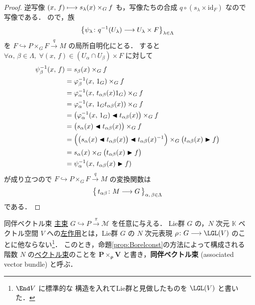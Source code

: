 \documentclass[TQFT_main]{subfiles}
\begin{document}
\begin{proof}
{        逆写像 $(x,\, f) \longmapsto s_\lambda(x) \times_G f$ も，\cinfty 写像たちの合成 $q \circ (s_\lambda \times \mathrm{id}_F)$ なので \cinfty 写像である．
    }
    ので，族 
    \begin{align}
        \bigl\{ \psi_\lambda \colon q^{-1}(U_\lambda) \longrightarrow U_\lambda \times F \bigr\}_{\lambda \in \Lambda}
    \end{align}
    を $F \hookrightarrow P \times_G F \xrightarrow{q} M$ の局所自明化にとる．
    すると $\forall \alpha,\, \beta \in \Lambda,\; \forall (x,\, f) \in (U_\alpha \cap U_\beta) \times F$ に対して
    \begin{align}
        \psi_\beta^{-1} (x,\, f) &= s_\beta(x) \times_G f \\
        &= \varphi_\beta^{-1}(x,\, 1_G) \times_G f \\
        &= \varphi_\alpha^{-1}(x,\, t_{\alpha\beta}(x)1_G) \times_G f \\
        &= \varphi_\alpha^{-1}(x,\, 1_G t_{\alpha\beta}(x)) \times_G f \\
        &= \bigl(\varphi_\alpha^{-1}(x,\, 1_G) \blacktriangleleft t_{\alpha\beta}(x)\bigr) \times_G f \\
        &= \bigl(s_\alpha (x) \blacktriangleleft t_{\alpha\beta}(x)\bigr) \times_G f \\
        &= \Bigl( \bigl(s_\alpha (x) \blacktriangleleft t_{\alpha\beta}(x)\bigr) \blacktriangleleft t_{\alpha\beta}(x)^{-1} \Bigr) \times_G \bigl(t_{\alpha\beta}(x) \blacktriangleright f\bigr) \\
        &= s_\alpha (x) \times_G \bigl( t_{\alpha\beta}(x) \blacktriangleright f \bigr) \\
        &= \psi_\alpha^{-1} (x,\, t_{\alpha\beta}(x) \blacktriangleright f)
    \end{align}
    が成り立つので $F \hookrightarrow P \times_G F \xrightarrow{q} M$ の変換関数は
    \begin{align}
        \bigl\{\, t_{\alpha\beta} \colon M \longrightarrow G  \,\bigr\}_{\alpha,\, \beta \in \Lambda}
    \end{align}
    である．
\end{proof}

\begin{myexample}[label=def:associated-vect]{同伴ベクトル束}
    \hyperref[def.fiber-1]{主束} $G \hookrightarrow P \xrightarrow{\pi} \mathcal{M}$ を任意に与える．
    Lie群 $G$ の，$N$ 次元 $\mathbb{K}$ ベクトル空間 $V$ への\hyperref[def:Lie-action]{左作用}とは，Lie群 $G$ の $N$ 次元表現 $\rho \colon G \lto \LGL (V)$ のことに他ならない\footnote{$\End V$ に標準的な \cinfty 構造を入れてLie群と見做したものを $\LGL (V)$ と書いた．}．
    このとき，命題\ref{prop:Borelconst}の方法によって構成される階数 $N$ の\hyperref[def:vect]{ベクトル束}のことを $\bm{P \times_\rho V}$ と書き，\textbf{同伴ベクトル束} (associated vector bundle) と呼ぶ．
\end{myexample}
\end{document}
